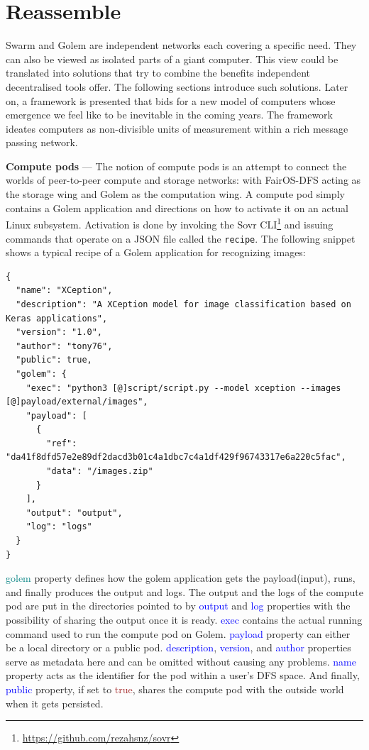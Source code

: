 \documentclass[a4paper, 10pt]{article}
\begin{document}
\section{Reassemble}
Swarm and Golem are independent networks each covering a specific need. They can also be viewed as isolated parts of a giant computer. This view could be translated into solutions that try to combine the benefits independent decentralised tools offer. The following sections introduce such solutions. Later on, a framework is presented that bids for a new model of computers whose emergence we feel like to be inevitable in the coming years. The framework ideates computers as non-divisible units of measurement within a rich message passing network.
\par
\textbf{Compute pods} --- The notion of compute pods is an attempt to connect the worlds of peer-to-peer compute and storage networks: with FairOS-DFS acting as the storage wing and Golem as the computation wing. A compute pod simply contains a Golem application and directions on how to activate it on an actual Linux subsystem. Activation is done by invoking the Sovr CLI\footnote{\url{https://github.com/rezahsnz/sovr}} and issuing commands that operate on a JSON file called the \texttt{recipe}. The following snippet shows a typical recipe of a Golem application for recognizing images:
\begin{verbatim}
{
  "name": "XCeption",
  "description": "A XCeption model for image classification based on Keras applications",
  "version": "1.0",
  "author": "tony76",
  "public": true,
  "golem": {
    "exec": "python3 [@]script/script.py --model xception --images [@]payload/external/images",
    "payload": [
      {
        "ref": "da41f8dfd57e2e89df2dacd3b01c4a1dbc7c4a1df429f96743317e6a220c5fac",
        "data": "/images.zip"
      }
    ],
    "output": "output",
    "log": "logs"
  }
}
\end{verbatim}
\textcolor{teal}{golem} property defines how the golem application gets the payload(input), runs, and finally produces the output and logs. The output and the logs of the compute pod are put in the directories pointed to by \textcolor{blue}{output} and \textcolor{blue}{log} properties with the possibility of sharing the output once it is ready. \textcolor{blue}{exec} contains the actual running command used to run the compute pod on Golem. \textcolor{blue}{payload} property can either be a local directory or a public pod. \textcolor{blue}{description}, \textcolor{blue}{version}, and \textcolor{blue}{author} properties serve as metadata here and can be omitted without causing any problems. \textcolor{blue}{name} property acts as the identifier for the pod within a user's DFS space. And finally, \textcolor{blue}{public} property, if set to \textcolor{brown}{true}, shares the compute pod with the outside world when it gets persisted.
\end{document}
